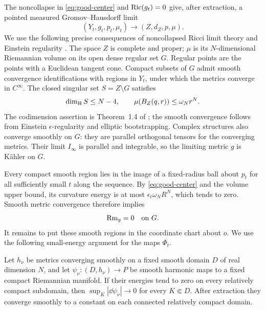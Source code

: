 The noncollapse in \eqref{eq:good-center} and $\operatorname{Ric}(g_t)=0$ give, after
extraction, a pointed measured Gromov--Hausdorff limit
\[
 (Y_t,g_t,p_t,\mu_t)\longrightarrow(Z,d_Z,p,\mu).
\]
We use the following precise consequences of noncollapsed Ricci limit
theory and Einstein regularity \cite{CheegerColding,ColdingVolume,CheegerNaber}.
The space $Z$ is complete and proper; $\mu$ is its $N$-dimensional
Riemannian volume on its open dense regular set $G$.  Regular points
are the points with a Euclidean tangent cone.  Compact subsets of $G$
admit smooth convergence identifications with regions in $Y_t$, under
which the metrics converge in $C^\infty$.  The closed singular set
$S=Z\setminus G$ satisfies
\begin{equation}
 \dim_{\rm H} S\le N-4,
 \qquad \mu(B_Z(q,r))\le\omega_Nr^N.
 \label{eq:limit-singular-set}
\end{equation}
The codimension assertion is Theorem~1.4 of \cite{CheegerNaber}; the
smooth convergence follows from Einstein $\epsilon$-regularity
\cite[Theorem~2.11]{CheegerNaber} and elliptic bootstrapping.
Complex structures also converge smoothly on
$G$: they are parallel orthogonal tensors for the converging metrics.
Their limit $I_\infty$ is parallel and integrable, so the limiting
metric $g$ is K\"ahler on $G$.

Every compact smooth region lies in the image of a fixed-radius ball
about $p_t$ for all sufficiently small $t$ along the sequence.  By
\eqref{eq:good-center} and the volume upper bound, its curvature energy
is at most $\epsilon_t\omega_NR^N$, which tends to zero.  Smooth metric
convergence therefore implies
\begin{equation}
 \operatorname{Rm}_g=0\quad\hbox{on }G.
 \label{eq:flat-regular-set}
\end{equation}
It remains to put these smooth regions in the coordinate chart about
$o$.  We use the following small-energy argument for the maps $\Phi_t$.

\begin{lemma}
\label{lem:small-energy}
Let $h_\nu$ be metrics converging smoothly on a fixed smooth domain $D$
of real dimension $N$,
and let $\psi_\nu:(D,h_\nu)\to P$ be smooth harmonic maps to a fixed
compact Riemannian manifold.  If their energies tend to zero on every
relatively compact subdomain, then
$\sup_K|\dd\psi_\nu|\to0$ for every $K\Subset D$.
After extraction they converge smoothly to a constant on each connected
relatively compact domain.
\end{lemma}

